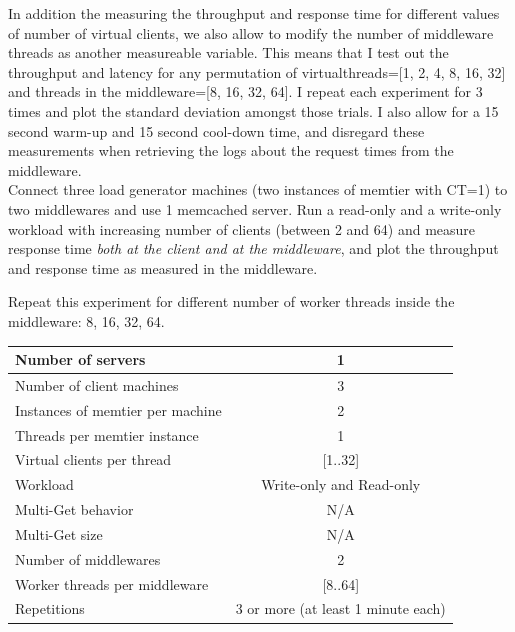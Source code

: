 \documentclass[11pt,a4paper]{article}
\begin{document}
In addition the measuring the throughput and response time for different values of number of virtual clients, we also allow to modify the number of middleware threads as another measureable variable.
This means that I test out the throughput and latency for any permutation of
virtualthreads=[1, 2, 4, 8, 16, 32] and threads in the middleware=[8, 16, 32, 64].
I repeat each experiment for 3 times and plot the standard deviation amongst those trials.
I also allow for a 15 second warm-up and 15 second cool-down time, and disregard these measurements when retrieving the logs about the request times from the middleware.\\

Connect three load generator machines (two instances of memtier with CT=1) to two middlewares and use 1 memcached server. Run a read-only and a write-only workload with increasing number of clients (between 2 and 64) and measure response time \emph{both at the client and at the middleware}, and plot the throughput and response time as measured in the middleware.

Repeat this experiment for different number of worker threads inside the middleware: 8, 16, 32, 64.

\begin{center}
	\scriptsize{
		\begin{tabular}{|l|c|}
			\hline Number of servers                & 1                        \\ 
			\hline Number of client machines        & 3                        \\ 
			\hline Instances of memtier per machine & 2                        \\ 
			\hline Threads per memtier instance     & 1                        \\
			\hline Virtual clients per thread       & [1..32]                  \\ 
			\hline Workload                         & Write-only and Read-only \\
			\hline Multi-Get behavior               & N/A                      \\
			\hline Multi-Get size                   & N/A                      \\
			\hline Number of middlewares            & 2                        \\
			\hline Worker threads per middleware    & [8..64]                  \\
			\hline Repetitions                      & 3 or more (at least 1 minute each)                \\ 
			\hline 
		\end{tabular}
	} 
\end{center}
\end{document}
